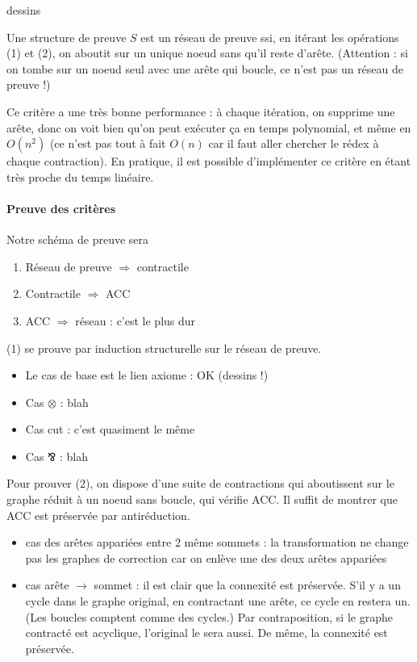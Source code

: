 \documentclass[a4paper, 11pt]{article}
\newcommand{\parr}{\mathbin{⅋}}
\begin{document}
dessins

Une structure de preuve $S$ est un réseau de preuve ssi, en itérant les opérations (1) et (2), on aboutit sur un unique noeud sans qu'il reste d'arête. (Attention : si on tombe sur un noeud seul avec une arête qui boucle, ce n'est pas un réseau de preuve !)

Ce critère a une très bonne performance : à chaque itération, on supprime une arête, donc on voit bien qu'on peut exécuter ça en temps polynomial, et même en $O(n^2)$ (ce n'est pas tout à fait $O(n)$ car il faut aller chercher le rédex à chaque contraction). En pratique, il est possible d'implémenter ce critère en étant très proche du temps linéaire.

\paragraph{Preuve des critères} Notre schéma de preuve sera
\begin{enumerate}
\item Réseau de preuve $\Rightarrow$ contractile
\item Contractile $\Rightarrow$ ACC
\item ACC $\Rightarrow$ réseau : c'est le plus dur
\end{enumerate}

(1) se prouve par induction structurelle sur le réseau de preuve.
\begin{itemize}
\item Le cas de base est le lien axiome : OK (dessins !)
\item Cas $\otimes$ : blah
\item Cas cut : c'est quasiment le même
\item Cas $\parr$ : blah
\end{itemize}

Pour prouver (2), on dispose d'une suite de contractions qui aboutissent sur le graphe réduit à un noeud sans boucle, qui vérifie ACC. Il suffit de montrer que ACC est préservée par antiréduction.
\begin{itemize}
\item cas des arêtes appariées entre 2 même sommets : la transformation ne change pas les graphes de correction car on enlève une des deux arêtes appariées
\item cas arête $\to$ sommet : il est clair que la connexité est préservée. S'il y a un cycle dans le graphe original, en contractant une arête, ce cycle en restera un. (Les boucles comptent comme des cycles.) Par contraposition, si le graphe contracté est acyclique, l'original le sera aussi. De même, la connexité est préservée.
\end{itemize}
\end{document}
